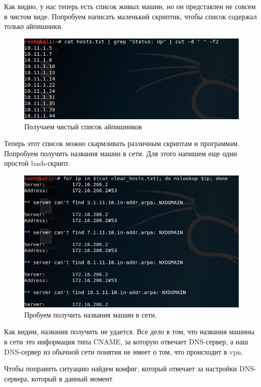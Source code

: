 \documentclass[a4paper,12pt]{article}
\begin{document}
Как видно, у нас теперь есть список живых машин, но он представлен не совсем в чистом виде. Попробуем написать маленький скриптик, чтобы список содержал только айпишники. 
\newpage
\begin{figure}[h!]
	\includegraphics[width=\linewidth]{cat_cut_3.png}
	\caption{Получаем чистый список айпишников}
	\label{fig:boat3}
\end{figure}

Теперь этот список можно скармливать различным скриптам и программам. Попробуем получить названия машин в сети. Для этого напишем еще один простой bash-скрипт. 	


\begin{figure}[h!]
	\includegraphics[width=\linewidth]{bad_nslookup_4.png}
	\caption{Пробуем получить названия машин в сети.}
	\label{fig:boat2}
\end{figure}

Как видим, названия получить не удается. Все дело в том, что названия машины в сети это информация типа CNAME, за которую отвечает DNS-сервер, а наш DNS-сервер из обычной сети понятия не имеет о том, что происходит в vpn.

Чтобы поправить ситуацию найдем конфиг, который отвечает за настройки DNS-сервера, который в данный момент 
\end{document}
